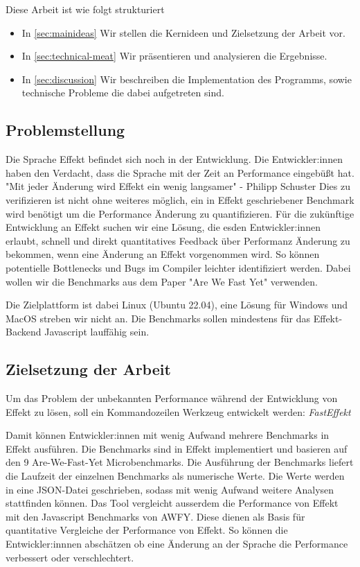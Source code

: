 \medskip
Diese Arbeit ist wie folgt strukturiert
\begin{itemize}
    \item In \cref{sec:mainideas} Wir stellen die Kernideen und Zielsetzung der Arbeit vor.
    \item In \cref{sec:technical-meat} Wir präsentieren und analysieren die Ergebnisse.
    \item In \cref{sec:discussion} Wir beschreiben die Implementation des Programms, sowie technische Probleme die dabei aufgetreten sind.
\end{itemize}

\subsection{ Problemstellung }
Die Sprache Effekt befindet sich noch in der Entwicklung. Die Entwickler:innen haben den Verdacht, dass die Sprache mit der Zeit an Performance eingebüßt hat.
"Mit jeder Änderung wird Effekt ein wenig langsamer" - Philipp Schuster
Dies zu verifizieren ist nicht ohne weiteres möglich, ein in Effekt geschriebener Benchmark wird benötigt um die Performance Änderung zu quantifizieren.
Für die zukünftige Entwicklung an Effekt suchen wir eine Lösung, die esden Entwickler:innen erlaubt, schnell und direkt quantitatives Feedback über Performanz Änderung zu bekommen, wenn eine Änderung an Effekt vorgenommen wird. So können potentielle Bottlenecks und Bugs im Compiler leichter identifiziert werden.
Dabei wollen wir die Benchmarks aus dem Paper "Are We Fast Yet" verwenden.

Die Zielplattform ist dabei Linux (Ubuntu 22.04), eine Lösung für Windows und MacOS streben wir nicht an.
Die Benchmarks sollen mindestens für das Effekt-Backend Javascript lauffähig sein.

\subsection{ Zielsetzung der Arbeit}

Um das Problem der unbekannten Performance während der Entwicklung von Effekt zu lösen, soll ein Kommandozeilen Werkzeug entwickelt werden: \textit{FastEffekt}

Damit können Entwickler:innen mit wenig Aufwand mehrere Benchmarks in Effekt ausführen.
Die Benchmarks sind in Effekt implementiert und basieren auf den 9 Are-We-Fast-Yet Microbenchmarks.
Die Ausführung der Benchmarks liefert die Laufzeit der einzelnen Benchmarks als numerische Werte. Die Werte werden in eine JSON-Datei geschrieben, sodass mit wenig Aufwand weitere Analysen stattfinden können.
Das Tool vergleicht ausserdem die Performance von Effekt mit den Javascript Benchmarks von AWFY. Diese dienen als Basis für quantitative Vergleiche der Performance von Effekt.
So können die Entwickler:innnen abschätzen ob eine Änderung an der Sprache die Performance verbessert oder verschlechtert.

